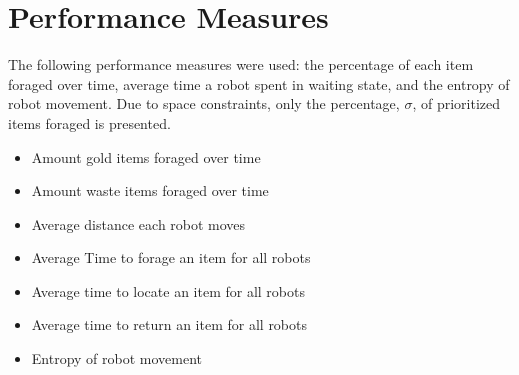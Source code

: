 \section{Performance Measures}
\label{thri:third:performancemeasures}

The following performance measures were used: the percentage of each item foraged over time, average time a robot spent in waiting state, and the entropy of robot movement. Due to space constraints, only the percentage, $\sigma$, of prioritized items foraged is presented. 

	\begin{itemize}
		\item	Amount gold items foraged over time
		\item	Amount waste items foraged over time
		\item	Average distance each robot moves
		\item	Average Time to forage an item for all robots
		\item	Average time to locate an item for all robots
		\item	Average time to return an item for all robots
		\item	Entropy of robot movement
	\end{itemize}
	

